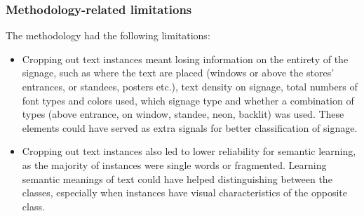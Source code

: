 \subsubsection{Methodology-related limitations}
The methodology had the following limitations:

\begin{itemize}
    \item Cropping out text instances meant losing information on the entirety of the signage, such as where the text are placed (windows or above the stores' entrances, or standees, posters etc.), text density on signage, total numbers of font types and colors used, which signage type and whether a combination of types (above entrance, on window, standee, neon, backlit) was used. These elements could have served as extra signals for better classification of signage.
    
    \item Cropping out text instances also led to lower reliability for semantic learning, as the majority of instances were single words or fragmented. Learning semantic meanings of text could have helped distinguishing between the classes, especially when instances have visual characteristics of the opposite class.
    
\end{itemize}

